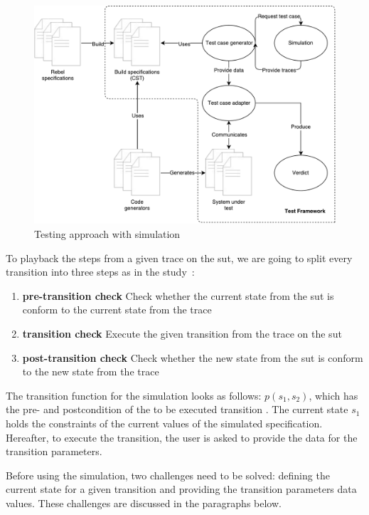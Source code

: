 \begin{figure}[h!]
  \centering
  \includegraphics[width=\linewidth{}]{figures/simulation-diagram.pdf}
  \caption{Testing approach with simulation}\label{fig:simulation-testing}
\end{figure}
\FloatBarrier

To playback the steps from a given trace on the \gls{sut}, we are going to split every
transition into three steps as in the
study~\cite[p.~6]{stoel_storm_vinju_bosman_2016}:
\begin{enumerate}
\item \textbf{pre-transition check} Check whether the current state from the \gls{sut}
is conform to the current state from the trace
\item \textbf{transition check} Execute the given transition from the trace on
the \gls{sut}
\item \textbf{post-transition check} Check whether the new state from the \gls{sut} is
conform to the new state from the trace
\end{enumerate}

The transition function for the simulation looks as follows: $p(s_{1}, s_{2})$,
which has the pre- and postcondition of the to be executed transition
\cite[p.6]{stoel_storm_vinju_bosman_2016}. The current state $s_{1}$ holds the
constraints of the current values of the simulated specification. Hereafter, to
execute the transition, the user is asked to provide the data for the transition
parameters.

Before using the simulation, two challenges need to be solved: defining the
current state for a given transition and providing the transition parameters
data values. These challenges are discussed in the paragraphs below.

